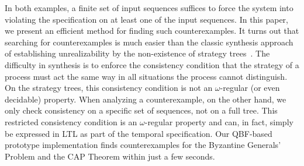 \documentclass{LMCS}
\theoremstyle{plain}\newtheorem{theorem}[thm]{Theorem}
\theoremstyle{plain}\newtheorem{lemma}[thm]{Lemma}
\theoremstyle{plain}\newtheorem{proposition}[thm]{Proposition}
\theoremstyle{plain}\newtheorem{corollary}[thm]{Corollary}
\theoremstyle{definition}\newtheorem{definition}{Definition}[section]
\begin{document}
In both examples, a finite set of input sequences suffices to force the system into violating the specification on at least one of the input sequences.
In this paper, we present an efficient method for finding such counterexamples.
It turns out that searching for counterexamples is much easier than the classic synthesis approach of establishing unrealizability by the non-existence of strategy trees~\cite{DBLP:conf/focs/PnueliR90,DBLP:conf/lics/KupfermanV01,DBLP:conf/lics/FinkbeinerS05}. The difficulty in synthesis is to enforce the consistency condition that the strategy of a process must act the same way in all situations the process cannot distinguish.
On the strategy trees, this consistency condition is not an $\omega$-regular (or even decidable) property. 
When analyzing a counterexample, on the other hand, we only check consistency on a specific set of sequences, not on a full tree. This restricted consistency condition is an $\omega$-regular property and can, in fact, simply be expressed in LTL as part of the temporal specification.
Our QBF-based prototype implementation finds counterexamples for the Byzantine Generals' Problem and the CAP Theorem within just a few seconds. 
\end{document}
